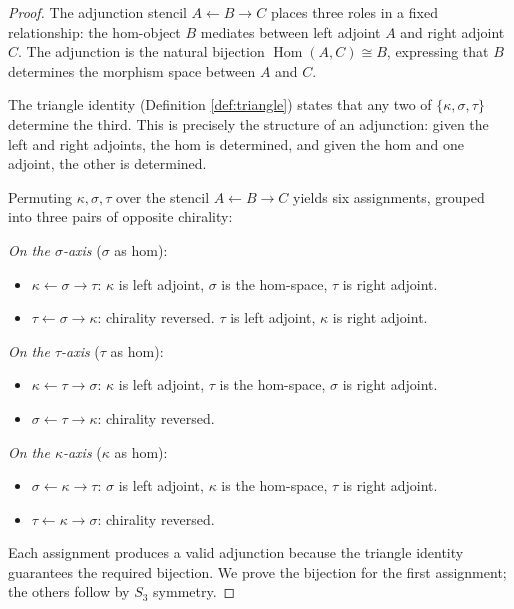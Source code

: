 \begin{proof}
The adjunction stencil $A \leftarrow B \to C$ places three
roles in a fixed relationship: the hom-object $B$ mediates
between left adjoint $A$ and right adjoint $C$. The
adjunction is the natural bijection
$\operatorname{Hom}(A, C) \cong B$, expressing that $B$
determines the morphism space between $A$ and $C$.

The triangle identity (Definition \ref{def:triangle})
states that any two of $\{\kappa, \sigma, \tau\}$ determine
the third. This is precisely the structure of an adjunction:
given the left and right adjoints, the hom is determined, and
given the hom and one adjoint, the other is determined.

Permuting $\kappa, \sigma, \tau$ over the stencil
$A \leftarrow B \to C$ yields six assignments, grouped
into three pairs of opposite chirality:

\emph{On the $\sigma$-axis} ($\sigma$ as hom):
\begin{itemize}[nosep]
  \item $\kappa \leftarrow \sigma \to \tau$:
    $\kappa$ is left adjoint, $\sigma$ is the hom-space,
    $\tau$ is right adjoint.
  \item $\tau \leftarrow \sigma \to \kappa$:
    chirality reversed. $\tau$ is left adjoint,
    $\kappa$ is right adjoint.
\end{itemize}

\emph{On the $\tau$-axis} ($\tau$ as hom):
\begin{itemize}[nosep]
  \item $\kappa \leftarrow \tau \to \sigma$:
    $\kappa$ is left adjoint, $\tau$ is the hom-space,
    $\sigma$ is right adjoint.
  \item $\sigma \leftarrow \tau \to \kappa$:
    chirality reversed.
\end{itemize}

\emph{On the $\kappa$-axis} ($\kappa$ as hom):
\begin{itemize}[nosep]
  \item $\sigma \leftarrow \kappa \to \tau$:
    $\sigma$ is left adjoint, $\kappa$ is the hom-space,
    $\tau$ is right adjoint.
  \item $\tau \leftarrow \kappa \to \sigma$:
    chirality reversed.
\end{itemize}

Each assignment produces a valid adjunction because the
triangle identity guarantees the required bijection. We
prove the bijection for the first assignment; the others
follow by $S_3$ symmetry.


\end{proof}
